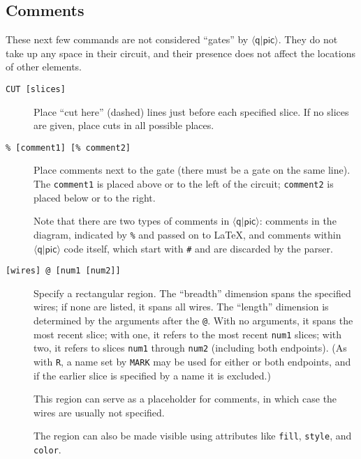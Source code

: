 \documentclass[twoside,12pt]{article}
\newcommand{\qpic}{$\langle\mathsf{q}|\mathsf{pic}\rangle$\xspace}
\begin{document}
\subsection{Comments}
\label{sec-comment}

These next few commands are not considered ``gates'' by \qpic.  They do not take up
any space
in their circuit, and their presence does not affect the locations of other elements.

\begin{description}

\item[{\tt CUT [slices]}] Place ``cut here'' (dashed) lines just before each specified slice.  If no slices
are given, place cuts in all possible places.

\begin{minipage}[b]{2in}

\end{minipage} \hfill 

\item[{\tt \% [comment1] [\% comment2]}] Place comments next to the
  gate (there must be a gate on the same line).  The {\tt comment1} is
  placed above or to the left of the circuit; {\tt comment2} is placed
  below or to the right.

\begin{minipage}[b]{2in}

\end{minipage} \hfill 

Note that there are two types of comments in \qpic:  comments in the diagram, indicated by {\tt \%} and passed on to
\LaTeX, and comments within \qpic code itself, which start with {\tt \#} and are discarded by the parser.

\item[{\tt [wires] @ [num1 [num2]]}] Specify a rectangular region.  The
  ``breadth'' dimension spans the specified wires; if none are listed, it spans all wires.
  The ``length'' dimension is determined by the arguments after the {\tt @}.  With no
  arguments, it spans the most recent slice; with one, it refers to the most recent
  {\tt num1} slices; with two, it refers to slices {\tt num1} through {\tt num2}
  (including both endpoints).  (As with {\tt R}, a name set by {\tt MARK} may be used
  for either or both endpoints, and if the earlier slice is specified by a name it
  is excluded.)

  This region can serve as a placeholder for comments, in which case the wires are
  usually not specified.

\begin{minipage}[b]{2in}

\end{minipage} \hfill 

The region can also be made visible using attributes like {\tt fill}, {\tt style},
and {\tt color}.

\begin{minipage}[b]{4.5in}

\end{minipage} \hfill 
\end{description}
\end{document}
